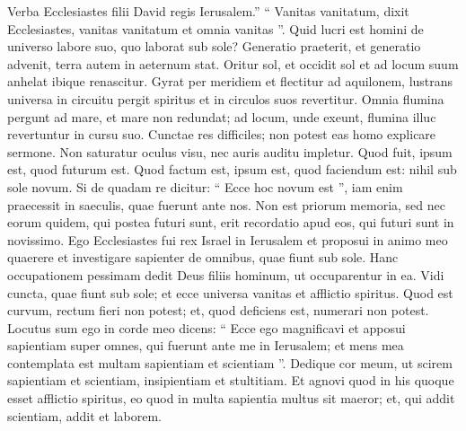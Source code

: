 \begin{biblechapter}
 \verse Verba Ecclesiastes filii David regis Ierusalem.”
 \verse “ Vanitas vanitatum,
 dixit Ecclesiastes,
 vanitas vanitatum et omnia vanitas ”.
 \verse Quid lucri est homini
 de universo labore suo, quo laborat sub sole?
 \verse Generatio praeterit, et generatio advenit,
 terra autem in aeternum stat.
 \verse Oritur sol, et occidit sol
 et ad locum suum anhelat ibique renascitur.
 \verse Gyrat per meridiem et flectitur ad aquilonem,
 lustrans universa in circuitu pergit spiritus
 et in circulos suos revertitur.
 \verse Omnia flumina pergunt ad mare, et mare non redundat;
 ad locum, unde exeunt, flumina illuc revertuntur in cursu suo.
 \verse Cunctae res difficiles;
 non potest eas homo explicare sermone.
 Non saturatur oculus visu,
 nec auris auditu impletur.
 \verse Quod fuit,
 ipsum est, quod futurum est.
 Quod factum est,
 ipsum est, quod faciendum est:
 \verse nihil sub sole novum.
 Si de quadam re dicitur: “ Ecce hoc novum est ”,
 iam enim praecessit in saeculis, quae fuerunt ante nos.
 \verse Non est priorum memoria,
 sed nec eorum quidem, qui postea futuri sunt,
 erit recordatio apud eos,
 qui futuri sunt in novissimo.
 \verse Ego Ecclesiastes fui rex Israel in Ierusalem 
\verse et proposui in animo meo quaerere et investigare sapienter de omnibus, quae fiunt sub sole. Hanc occupationem pessimam dedit Deus filiis hominum, ut occuparentur in ea. 
\verse Vidi cuncta, quae fiunt sub sole; et ecce universa vanitas et afflictio spiritus.
 \verse Quod est curvum, rectum fieri non potest;
 et, quod deficiens est, numerari non potest.
 \verse Locutus sum ego in corde meo dicens: “ Ecce ego magnificavi et apposui sapientiam super omnes, qui fuerunt ante me in Ierusalem; et mens mea contemplata est multam sapientiam et scientiam ”. 
\verse Dedique cor meum, ut scirem sapientiam et scientiam, insipientiam et stultitiam. Et agnovi quod in his quoque esset afflictio spiritus, eo quod
 \verse in multa sapientia multus sit maeror;
 et, qui addit scientiam, addit et laborem.
 

\end{biblechapter}
